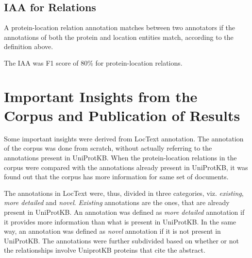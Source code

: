 \subsection*{IAA for Relations}

A protein-location relation annotation matches between two annotators if the annotations of both the protein and location entities match, according to the definition above.

The IAA was F1 score of 80\% for protein-location relations.

\section{Important Insights from the Corpus and Publication of Results}

Some important insights were derived from LocText annotation. The annotation of the corpus was done from scratch, without actually referring to the annotations present in UniProtKB. When the protein-location relations in the corpus were compared with the annotations already present in UniProtKB, it was found out that the corpus has more information for same set of documents.

The annotations in LocText were, thus, divided in three categories, viz. \textit{existing}, \textit{more detailed} and \textit{novel}. \textit{Existing} annotations are the ones, that are already present in UniProtKB. An annotation was defined as \textit{more detailed} annotation if it provides more information than what is present in UniProtKB. In the same way, an annotation was defined as \textit{novel} annotation if it is not present in UniProtKB. The annotations were further subdivided based on whether or not the relationships involve UniprotKB proteins that cite the abstract.

